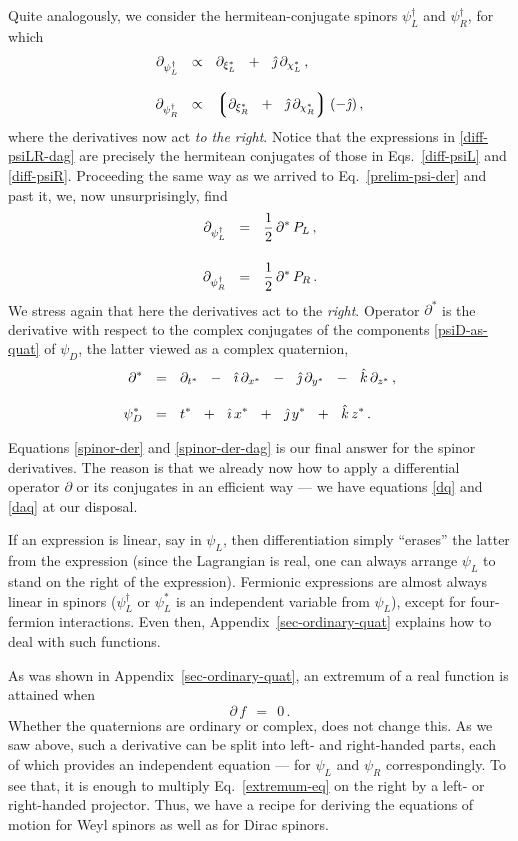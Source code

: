 \documentclass[epsfig,12pt]{article}
\newcommand{\p}{\partial}
\newcommand{\lgr}{\left\lgroup}
\newcommand{\rgr}{\right\rgroup}
\newcommand{\ii}{\hat\imath}
\newcommand{\jj}{\hat\jmath}
\newcommand{\kk}{\hat k}
\begin{document}
	Quite analogously, we consider the hermitean-conjugate spinors $ \psi_L^\dag $ and $ \psi_R^\dag $,
	for which
\begin{align}
%
\notag
	\p_{\psi_L^\dag}	& ~~\propto~~	\p_{\xi_L^*}  ~~+~~  \jj\,\p_{\chi_L^*}\,,
	\\[3mm]
%
\label{diff-psiLR-dag}
	\p_{\psi_R^\dag}	& ~~\propto~~	\lgr \p_{\xi_R^*}  ~~+~~ \jj\,\p_{\chi_R^*} \rgr (-\jj)\,,
\end{align}
	where the derivatives now act \emph{to the right}.
	Notice that the expressions in \eqref{diff-psiLR-dag} are precisely the hermitean conjugates
	of those in Eqs.~\eqref{diff-psiL} and \eqref{diff-psiR}.
	Proceeding the same way as we arrived to Eq.~\eqref{prelim-psi-der} and past it,
	we, now unsurprisingly, find
\begin{align}
%
\notag
	\p_{\psi_L^\dag}	& ~~=~~		\frac 1 2\, \p^*\, P_L\,,
	\\[4mm]
%
\label{spinor-der-dag}
	\p_{\psi_R^\dag}	& ~~=~~		\frac 1 2\, \p^*\, P_R\,.
\end{align}
	We stress again that here the derivatives act to the \emph{right}.
	Operator $ \p^* $ is the derivative with respect to the complex conjugates of the
	components \eqref{psiD-as-quat} of $ \psi_D $,
	the latter viewed as a complex quaternion,
\begin{align}
%
\notag
	\p^*		& ~~=~~	 \p_{t^*}  ~~-~~  \ii\,\p_{x^*}  ~~-~~  \jj\,\p_{y^*}  ~~-~~  \kk\,\p_{z^*}\,,
	\\[3mm]
%
	\psi_D^*	& ~~=~~  t^*  ~~+~~  \ii\,x^*  ~~+~~  \jj\,y^*  ~~+~~  \kk\,z^*\,.
\end{align}

	Equations \eqref{spinor-der} and \eqref{spinor-der-dag} is our final answer
	for the spinor derivatives.
	The reason is that we already now how to apply a differential operator $ \p $
	or its conjugates in an efficient way --- we have equations \eqref{dq} and \eqref{daq}
	at our disposal.

	If an expression is linear, say in $ \psi_L $, then differentiation
	simply ``erases'' the latter from the expression
	(since the Lagrangian is real, one can always arrange $ \psi_L $ to stand
	on the right of the expression).
	Fermionic expressions are almost always linear in spinors ($ \psi_L^\dag $ or
	$ \psi_L^* $ is an independent variable from $ \psi_L $),
	except for four-fermion interactions.
	Even then, Appendix~\ref{sec-ordinary-quat} explains how to deal with such functions.

	As was shown in Appendix~\ref{sec-ordinary-quat}, an extremum of a real function
	is attained when
\begin{equation}
\label{extremum-eq}
	\p\,f	~~=~~	0\,.
\end{equation}
	Whether the quaternions are ordinary or complex, does not change this.
	As we saw above, such a derivative can be split into left- and right-handed parts,
	each of which provides an independent equation --- for $ \psi_L $ and $ \psi_R $
	correspondingly.
	To see that, it is enough to multiply Eq.~\eqref{extremum-eq}
	on the right by a left- or right-handed projector.
	Thus, we have a recipe for deriving the equations of motion for Weyl spinors
	as well as for Dirac spinors.
\end{document}
